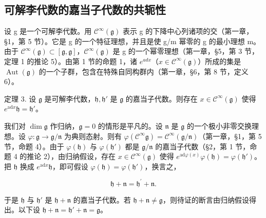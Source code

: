 \subsection{可解李代数的嘉当子代数的共轭性}

设 g 是一个可解李代数。用 \(\mathcal{C}^{\infty}(\mathfrak{g})\) 表示 g 的下降中心列诸项的交（第一章，§1，第 5 节）。它是 g 的一个特征理想，并且是使 g/m 幂零的 g 的最小理想 m。由于 \(\mathcal{C}^{\infty}(\mathfrak{g}) \subset [\mathfrak{g}, \mathfrak{g}]\)，\(\mathcal{C}^{\infty}(\mathfrak{g})\) 是 g 的一个幂零理想（第一章，§5，第 3 节，定理 1 的推论 5）。由第 1 节的命题 1，诸 \(e^{ad x}\)（\(x \in \mathcal{C}^{\infty}(\mathfrak{g})\)）所成的集是 \(\operatorname{Aut}(\mathfrak{g})\) 的一个子群，包含在特殊自同构群内（第一章，§6，第 8 节，定义 6）。

定理 3. 设 \(\mathfrak{g}\) 是可解李代数，\(\mathfrak{h},\mathfrak{h}'\) 是 \(\mathfrak{g}\) 的嘉当子代数。则存在 \(x\in \mathcal{C}^{\infty}(\mathfrak{g})\) 使得 \(e^{\mathrm{ad}x}\mathfrak{h} = \mathfrak{h}'\)。

我们对 \(\dim \mathfrak{g}\) 作归纳，\(\mathfrak{g} = 0\) 的情形是平凡的。设 \(\mathfrak{n}\) 是 \(\mathfrak{g}\) 的一个极小非零交换理想。设 \(\varphi : \mathfrak{g} \to \mathfrak{g} / \mathfrak{n}\) 为典则态射。则有 \(\varphi(\mathcal{C}^{\infty} \mathfrak{g}) = \mathcal{C}^{\infty}(\mathfrak{g} / \mathfrak{n})\)（第一章，§1，第 5 节，命题 4）。由于 \(\varphi(\mathfrak{h})\) 与 \(\varphi(\mathfrak{h}')\) 都是 \(\mathfrak{g} / \mathfrak{n}\) 的嘉当子代数（§2，第 1 节，命题 4 的推论 2），由归纳假设，存在 \(x \in \mathcal{C}^{\infty}(\mathfrak{g})\) 使得 \(e^{\mathrm{ad} \varphi(x)}\varphi(\mathfrak{h}) = \varphi(\mathfrak{h}')\)。把 \(\mathfrak{h}\) 换成 \(e^{\mathrm{ad} x}\mathfrak{h}\)，即可假设 \(\varphi(\mathfrak{h}) = \varphi(\mathfrak{h}')\)，换言之，

\[
\mathfrak {h} + \mathfrak {n} = \mathfrak {h} ^ {\prime} + \mathfrak {n}.
\]

于是 \(\mathfrak{h}\) 与 \(\mathfrak{h}'\) 是 \(\mathfrak{h} + \mathfrak{n}\) 的嘉当子代数。若 \(\mathfrak{h} + \mathfrak{n} \neq \mathfrak{g}\)，则待证的断言由归纳假设得出。以下设 \(\mathfrak{h} + \mathfrak{n} = \mathfrak{h}' + \mathfrak{n} = \mathfrak{g}\)。

